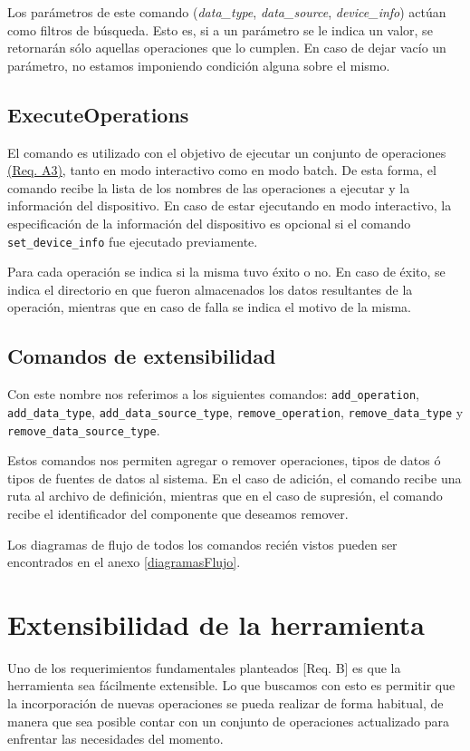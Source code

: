Los parámetros de este comando (\emph{data\_type}, \emph{data\_source}, \emph{device\_info}) actúan como filtros de búsqueda. Esto es, si a un parámetro se le indica un valor, se retornarán sólo aquellas operaciones que lo cumplen. En caso de dejar vacío un parámetro, no estamos imponiendo condición alguna sobre el mismo.

\subsection*{ExecuteOperations}
El comando es utilizado con el objetivo de ejecutar un conjunto de operaciones \hyperref[reqA3]{(Req. A3)}, tanto en modo interactivo como en modo batch. De esta forma, el comando recibe la lista de los nombres de las operaciones a ejecutar y la información del dispositivo. En caso de estar ejecutando en modo interactivo, la especificación de la información del dispositivo es opcional si el comando \texttt{set\_device\_info} fue ejecutado previamente.

Para cada operación se indica si la misma tuvo éxito o no. En caso de éxito, se indica el directorio en que fueron almacenados los datos resultantes de la operación, mientras que en caso de falla se indica el motivo de la misma.

\subsection*{Comandos de extensibilidad}
Con este nombre nos referimos a los siguientes comandos: \texttt{add\_operation}, \texttt{add\_data\_type}, \texttt{add\_data\_source\_type}, \texttt{remove\_operation}, \texttt{remove\_data\-\_type} y \texttt{remove\_data\_source\_type}.

Estos comandos nos permiten agregar o remover operaciones, tipos de datos ó tipos de fuentes de datos al sistema. En el caso de adición, el comando recibe una ruta al archivo de definición, mientras que en el caso de supresión, el comando recibe el identificador del componente que deseamos remover.
\newline

Los diagramas de flujo de todos los comandos recién vistos pueden ser encontrados en el anexo \ref{diagramasFlujo}.

\section{Extensibilidad de la herramienta}
\label{extensibilidadDeLaHerramienta}
Uno de los requerimientos fundamentales planteados [Req. B] es que la herramienta sea fácilmente extensible. Lo que buscamos con esto es permitir que la incorporación de nuevas operaciones se pueda realizar de forma habitual, de manera que sea posible contar con un conjunto de operaciones actualizado para enfrentar las necesidades del momento.

